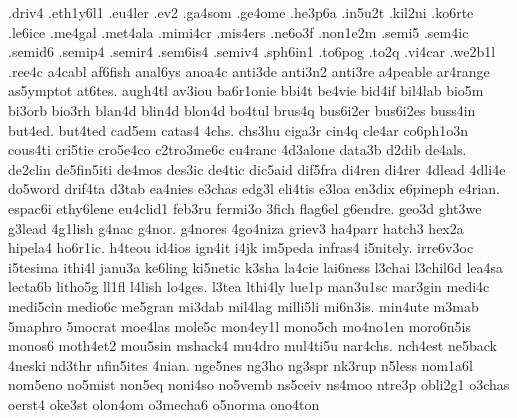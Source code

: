 .driv4
.eth1y6l1
.eu4ler
.ev2
.ga4som
.ge4ome
.he3p6a
.in5u2t
.kil2ni
.ko6rte
.le6ice
.me4gal
.met4ala
.mimi4cr
.mis4ers
.ne6o3f
.non1e2m
.semi5
.sem4ic
.semid6
.semip4
.semir4
.sem6is4
.semiv4
.sph6in1
.to6pog
.to2q
.vi4car
.we2b1l
.ree4c
a4cabl
af6fish
anal6ys
anoa4c
anti3de
anti3n2
anti3re
a4peable
ar4range
as5ymptot
at6tes.
augh4tl
av3iou
ba6r1onie
bbi4t
be4vie
bid4if
bil4lab
bio5m
bi3orb
bio3rh
blan4d
blin4d
blon4d
bo4tul
brus4q
bus6i2er
bus6i2es
buss4in
but4ed.
but4ted
cad5em
catas4
4chs.
chs3hu
ciga3r
cin4q
cle4ar
co6ph1o3n
cous4ti
cri5tie
cro5e4co
c2tro3me6c
cu4ranc
4d3alone
data3b
d2dib
de4als.
de2clin
de5fin5iti
de4mos
des3ic
de4tic
dic5aid
dif5fra
di4ren
di4rer
4dlead
4dli4e
do5word
drif4ta
d3tab
ea4nies
e3chas
edg3l
eli4tis
e3loa
en3dix
e6pineph
e4rian.
espac6i
ethy6lene
eu4clid1
feb3ru
fermi3o
3fich
flag6el
g6endre.
geo3d
ght3we
g3lead
4g1lish
g4nac
g4nor.
g4nores
4go4niza
griev3
ha4parr
hatch3
hex2a
hipela4
ho6r1ic.
h4teou
id4ios
ign4it
i4jk
im5peda
infras4
i5nitely.
irre6v3oc
i5tesima
ithi4l
janu3a
ke6ling
ki5netic
k3sha
la4cie
lai6ness
l3chai
l3chil6d
lea4sa
lecta6b
litho5g
ll1fl
l4lish
lo4ges.
l3tea
lthi4ly
lue1p
man3u1sc
mar3gin
medi4c
medi5cin
medio6c
me5gran
mi3dab
mil4lag
milli5li
mi6n3is.
min4ute
m3mab
5maphro
5mocrat
moe4las
mole5c
mon4ey1l
mono5ch
mo4no1en
moro6n5is
monos6
moth4et2
mou5sin
mshack4
mu4dro
mul4ti5u
nar4chs.
nch4est
ne5back
4neski
nd3thr
nfin5ites
4nian.
nge5nes
ng3ho
ng3spr
nk3rup
n5less
nom1a6l
nom5eno
no5mist
non5eq
noni4so
no5vemb
ns5ceiv
ns4moo
ntre3p
obli2g1
o3chas
oerst4
oke3st
olon4om
o3mecha6
o5norma
ono4ton
